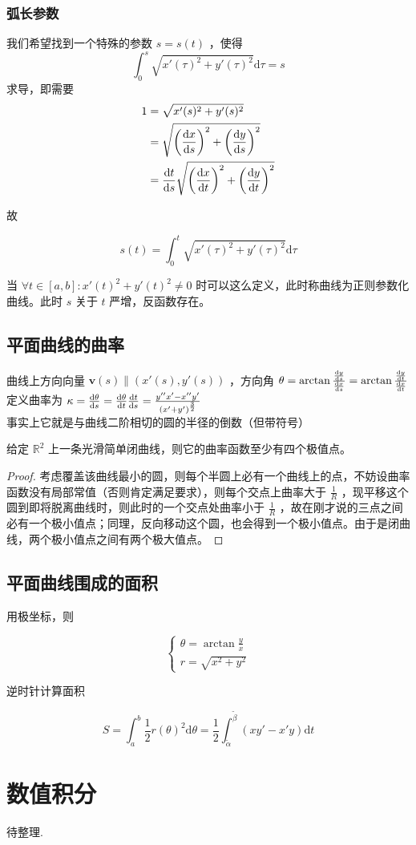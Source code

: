 \subsubsection*{弧长参数}
我们希望找到一个特殊的参数 $s=s(t)$ ，使得 \[ \int_0^s\sqrt{x'(\tau)^2+y'(\tau)^2}\mathrm d\tau=s \]
求导，即需要
\begin{align*}
    1&=\sqrt{x'(s)^2+y'(s)^2}\\
    &=\sqrt{\left({\mathrm dx\over\mathrm ds}\right)^2+\left({\mathrm dy\over\mathrm ds}\right)^2}\\
    &={\mathrm dt\over \mathrm ds}\sqrt{\left({\mathrm dx\over\mathrm dt}\right)^2+\left({\mathrm dy\over\mathrm dt}\right)^2}
\end{align*}

故

$$
s(t)=\int_0^t \sqrt{x'(\tau)^2+y'(\tau)^2}\mathrm d\tau
$$

当 $\forall t\in[a, b]: x'(t)^2+y'(t)^2\ne0$ 时可以这么定义，此时称曲线为正则参数化曲线。此时 $s$ 关于 $t$ 严增，反函数存在。

\subsection*{平面曲线的曲率}

曲线上方向向量 $\mathbf v(s) \parallel \left(x'(s), y'(s)\right)$ ，方向角 $\theta=\arctan{{\mathrm dy\over\mathrm ds}\over{\mathrm dx\over\mathrm ds}}=\arctan{{\mathrm dy\over\mathrm dt}\over{\mathrm dx\over\mathrm dt}}$\\

定义曲率为 $\kappa={\mathrm d\theta\over\mathrm ds}={\mathrm d\theta\over\mathrm dt}{\mathrm dt\over\mathrm ds}={y''x'-x''y'\over\left(x'+y'\right)^\frac32}$\\

事实上它就是与曲线二阶相切的圆的半径的倒数（但带符号）\\
\begin{thm}[四顶点定理]
    给定 $\mathbb R^2$ 上一条光滑简单闭曲线，则它的曲率函数至少有四个极值点。
\end{thm}

\begin{proof}
    考虑覆盖该曲线最小的圆，则每个半圆上必有一个曲线上的点，不妨设曲率函数没有局部常值（否则肯定满足要求），则每个交点上曲率大于 $\frac1R$ ，现平移这个圆到即将脱离曲线时，则此时的一个交点处曲率小于 $\frac1R$ ，故在刚才说的三点之间必有一个极小值点；同理，反向移动这个圆，也会得到一个极小值点。由于是闭曲线，两个极小值点之间有两个极大值点。
\end{proof}

\subsection*{平面曲线围成的面积}

用极坐标，则

$$
\begin{cases}
    \theta=\arctan\frac yx\\
    r=\sqrt{x^2+y^2}
\end{cases}
$$

逆时针计算面积

$$
S=\int_a^b\frac12r(\theta)^2\mathrm d\theta=\frac12\int_{\tilde\alpha}^{\tilde\beta}\left(xy'-x'y\right)\mathrm dt
$$

\section{数值积分}

待整理.

